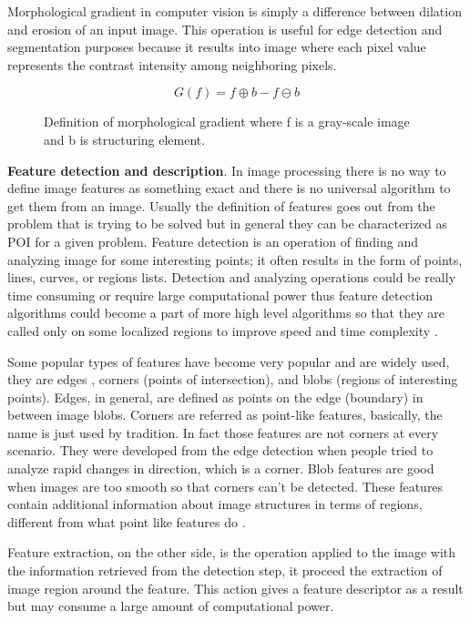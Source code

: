 \documentclass[../../../../main]{subfiles}
\begin{document}
Morphological gradient in computer vision is simply a difference between dilation and erosion of an input image. This operation is useful for edge detection and segmentation purposes because it results into image where each pixel value represents the contrast intensity among neighboring pixels.

\begin{figure} [!ht]
  \centering    
    \begin{equation}
        G(f) = f \oplus b - f \ominus b
    \end{equation}
  \caption{Definition of morphological gradient where f is a gray-scale image and b is structuring element.}
\end{figure}

\textbf{Feature detection and description}. In image processing there is no way to define image features as something exact and there is no universal algorithm to get them from an image. Usually the definition of features goes out from the problem that is trying to be solved but in general they can be characterized as \ac{POI} for a given problem. 
Feature detection is an operation of finding and analyzing image for some interesting points; it often results in the form of points, lines, curves, or regions lists. Detection and analyzing operations could be really time consuming or require large computational power thus feature detection algorithms could become a part of more high level algorithms so that they are called only on some localized regions to improve speed and time complexity \cite{opencv_docs_understanding_features}. 

Some popular types of features have become very popular and are widely used, they are edges \cite{cv_basics_3_linda_shapiro}, corners (points of intersection), and blobs (regions of interesting points).
Edges, in general, are defined as points on the edge (boundary) in between image blobs. Corners are referred as point-like features, basically, the name is just used by tradition. In fact those features are not corners at every scenario. They were developed from the edge detection when people tried to analyze rapid changes in direction, which is a corner. Blob features are good when images are too smooth so that corners can't be detected. These features contain additional information about image structures in terms of regions, different from what point like features do \cite{feature_matching_presentation}.

Feature extraction, on the other side, is the operation applied to the image with the information retrieved from the detection step, it proceed the extraction of image region around the feature. This action gives a feature descriptor as a result but may consume a large amount of computational power.
\end{document}
